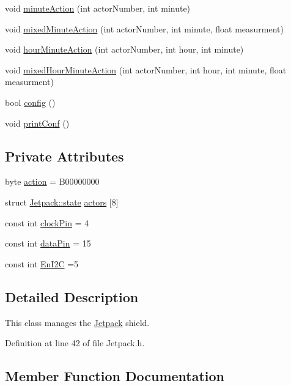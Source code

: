 \begin{DoxyCompactItemize}
\item 
void \hyperlink{class_jetpack_a97da41141c7b53ddee61143519c8d17d}{minute\+Action} (int actor\+Number, int minute)
\item 
void \hyperlink{class_jetpack_acf8ed1fb594b9e8e224f4ed872a8e093}{mixed\+Minute\+Action} (int actor\+Number, int minute, float measurment)
\item 
void \hyperlink{class_jetpack_ae01c13c785ebdf1b0bb5500234aba1bd}{hour\+Minute\+Action} (int actor\+Number, int hour, int minute)
\item 
void \hyperlink{class_jetpack_a273dae1517b56f0242e28b8944edc26b}{mixed\+Hour\+Minute\+Action} (int actor\+Number, int hour, int minute, float measurment)
\item 
bool \hyperlink{class_jetpack_ab065ee83e244265a2223a22f3ee4a719}{config} ()
\item 
void \hyperlink{class_jetpack_ac54a7bb4f9166bee32052253d9b1d306}{print\+Conf} ()
\end{DoxyCompactItemize}
\subsection*{Private Attributes}
\begin{DoxyCompactItemize}
\item 
byte \hyperlink{class_jetpack_aca3142925a7b0834b34ae91d26af7765}{action} = B00000000
\item 
struct \hyperlink{struct_jetpack_1_1state}{Jetpack\+::state} \hyperlink{class_jetpack_a7e16d2f97837f9712a2e6de1c50d99db}{actors} \mbox{[}8\mbox{]}
\item 
const int \hyperlink{class_jetpack_a58ebb991f358f3ae94e82148b0221b5a}{clock\+Pin} = 4
\item 
const int \hyperlink{class_jetpack_a3d669a56e93c71dd25f970d4ed7d0c00}{data\+Pin} = 15
\item 
const int \hyperlink{class_jetpack_a81df984fb4cea98c71aa1a1cfcdfe814}{En\+I2C} =5
\end{DoxyCompactItemize}


\subsection{Detailed Description}
This class manages the \hyperlink{class_jetpack}{Jetpack} shield. 

Definition at line 42 of file Jetpack.\+h.



\subsection{Member Function Documentation}
\mbox{\label{class_jetpack_a5a53e1ebf7aaf3bf3e0d37ea64ca09a7}} 
